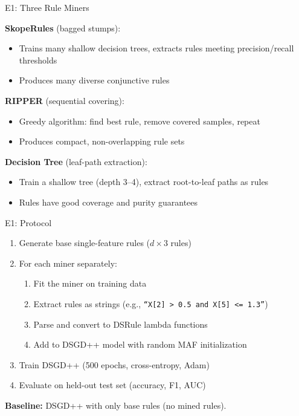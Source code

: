 \documentclass[aspectratio=169,12pt]{beamer}
\begin{document}
\begin{frame}{E1: Three Rule Miners}

\textbf{SkopeRules} (bagged stumps):
\begin{itemize}
    \item Trains many shallow decision trees, extracts rules meeting precision/recall thresholds
    \item Produces many diverse conjunctive rules
\end{itemize}

\vspace{0.8em}
\textbf{RIPPER} (sequential covering):
\begin{itemize}
    \item Greedy algorithm: find best rule, remove covered samples, repeat
    \item Produces compact, non-overlapping rule sets
\end{itemize}

\vspace{0.8em}
\textbf{Decision Tree} (leaf-path extraction):
\begin{itemize}
    \item Train a shallow tree (depth 3--4), extract root-to-leaf paths as rules
    \item Rules have good coverage and purity guarantees
\end{itemize}

\end{frame}

\begin{frame}{E1: Protocol}

\begin{enumerate}
    \item Generate base single-feature rules ($d \times 3$ rules)

    \vspace{0.5em}
    \item For each miner separately:
    \begin{enumerate}
        \item[a.] Fit the miner on training data
        \item[b.] Extract rules as strings (e.g., \texttt{``X[2] > 0.5 and X[5] <= 1.3''})
        \item[c.] Parse and convert to DSRule lambda functions
        \item[d.] Add to DSGD++ model with random MAF initialization
    \end{enumerate}

    \vspace{0.5em}
    \item Train DSGD++ (500 epochs, cross-entropy, Adam)

    \vspace{0.5em}
    \item Evaluate on held-out test set (accuracy, F1, AUC)
\end{enumerate}

\vspace{1em}
\textbf{Baseline:} DSGD++ with only base rules (no mined rules).

\end{frame}
\end{document}
